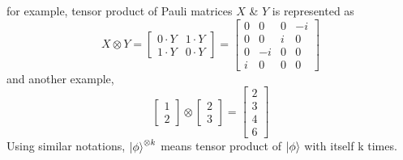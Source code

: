 \begin{enumerate}
    for example, tensor product of Pauli matrices $X$ \& $Y$ is represented as
    \begin{equation}
        X \otimes Y =
        \begin{bmatrix}
            0\cdot Y & 1\cdot Y \\
            1\cdot Y & 0\cdot Y
        \end{bmatrix}
        =
        \begin{bmatrix}
            0 & 0 & 0 & -i \\
            0 & 0 & i & 0 \\
            0 & -i & 0 & 0 \\
            i & 0 & 0 & 0
        \end{bmatrix}
    \end{equation}
    and another example, 
    \begin{equation}
        \begin{bmatrix}
            1 \\ 2
        \end{bmatrix}
        \otimes
        \begin{bmatrix}
            2 \\ 3
        \end{bmatrix}
        = 
        \begin{bmatrix}
            2 \\ 3 \\ 4 \\ 6
        \end{bmatrix}
    \end{equation}
    Using similar notations, $\ket{\phi}^{\otimes k}$ means tensor product of $\ket{\phi}$ with itself k times.
\end{enumerate}

